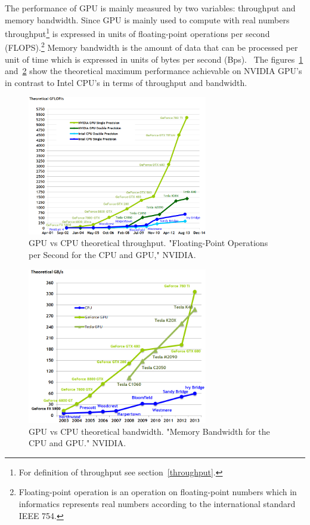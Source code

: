 \documentclass[12pt,oneside]{fithesis2}
\begin{document}
The performance of GPU is mainly measured by two variables: throughput and memory bandwidth. Since GPU is mainly used to compute with real numbers throughput\footnote{For definition of throughput see section~\ref{throughput}.} is expressed in units of floating-point operations per second (FLOPS).\footnote{Floating-point operation is an operation on floating-point numbers which in informatics represents real numbers according to the international standard IEEE 754.} Memory bandwidth is the amount of data that can be processed per unit of time which is expressed in units of bytes per second (Bps).~\cite{professional_cuda} The figures~\ref{fig:gpu_throughput} and~\ref{fig:gpu_bandwith} show the theoretical maximum performance achievable on NVIDIA GPU's in contrast to Intel CPU's in terms of throughput and bandwidth.

\begin{figure}[H]
	\centering
	\includegraphics[width=0.7\textwidth]{figures/floating-point-operations-per-second.png}
	\caption{GPU vs CPU theoretical throughput. "Floating-Point Operations per Second for the CPU and GPU," NVIDIA.~\cite{cuda_guide}}
	\label{fig:gpu_throughput}
\end{figure}

\begin{figure}[H]
	\centering
	\includegraphics[width=0.7\textwidth]{figures/memory-bandwidth.png}
	\caption{GPU vs CPU theoretical bandwidth. "Memory Bandwidth for the CPU and GPU." NVIDIA.~\cite{cuda_guide}}
	\label{fig:gpu_bandwith}
\end{figure}
\end{document}
